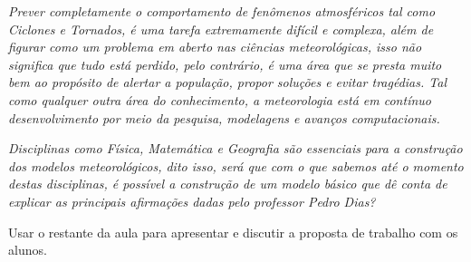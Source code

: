 \documentclass[
12pt,				%
openright,			%
oneside,			%
a4paper,			%
chapter=TITLE,		%
english,			%
brazil				%
]{abntex2}
\begin{document}
\emph{Prever completamente o comportamento de fenômenos atmosféricos tal como Ciclones e Tornados, é uma tarefa extremamente difícil e complexa, além de figurar como um problema em aberto nas ciências meteorológicas, isso não significa que tudo está perdido, pelo contrário, é uma área que se presta muito bem ao propósito de alertar a população, propor soluções e evitar tragédias. Tal como qualquer outra área do conhecimento, a meteorologia está em contínuo desenvolvimento por meio da pesquisa, modelagens e avanços computacionais.}

\emph{Disciplinas como Física, Matemática e Geografia são essenciais para a construção dos modelos meteorológicos, dito isso, será que com o que sabemos até o momento destas disciplinas, é possível a construção de um modelo básico que dê conta de explicar as principais afirmações dadas pelo professor Pedro Dias?}

Usar o restante da aula para apresentar e discutir a proposta de trabalho com os alunos.
% 
\end{document}
